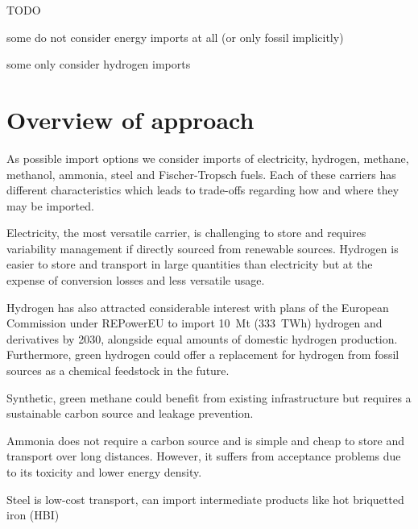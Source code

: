 
TODO



some do not consider energy imports at all (or only fossil implicitly)

some only consider hydrogen imports






\section*{Overview of approach}



As possible import options we consider imports of electricity, hydrogen,
methane, methanol, ammonia, steel and Fischer-Tropsch fuels. Each of these
carriers has different characteristics which leads to trade-offs regarding how
and where they may be imported.

Electricity, the most versatile carrier, is challenging to store and requires
variability management if directly sourced from renewable sources. Hydrogen is
easier to store and transport in large quantities than electricity but at the
expense of conversion losses and less versatile usage.

Hydrogen has also attracted considerable interest with plans of the European
Commission under \mbox{REPowerEU}\cite{europeancommissionRepowerEUPlan} to
import 10~Mt (333~TWh) hydrogen and derivatives by 2030, alongside equal amounts
of domestic hydrogen production. Furthermore, green hydrogen could offer a
replacement for hydrogen from fossil sources as a chemical feedstock in the
future.

Synthetic, green methane could benefit from existing infrastructure but requires
a sustainable carbon source and leakage prevention.

Ammonia does not require a carbon source and is simple and cheap to store and
transport over long distances. However, it suffers from acceptance problems due
to its toxicity and lower energy density.

Steel is low-cost transport, can import intermediate products like hot briquetted iron (HBI)


